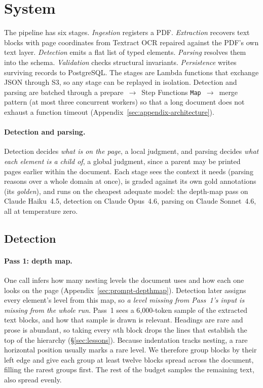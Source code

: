 \documentclass[11pt]{article}
\begin{document}
\section{System}
\label{sec:method}

The pipeline has six stages. \emph{Ingestion} registers a PDF.
\emph{Extraction} recovers text blocks with page coordinates from Textract OCR
repaired against the PDF's own text layer. \emph{Detection} emits a flat list of
typed elements. \emph{Parsing} resolves them into the schema.
\emph{Validation} checks structural invariants. \emph{Persistence} writes
surviving records to PostgreSQL. The stages are Lambda functions that exchange JSON
through S3, so any stage can be replayed in isolation. Detection and parsing
are batched through a prepare~$\rightarrow$~Step Functions
\texttt{Map}~$\rightarrow$~merge pattern (at most three concurrent workers) so
that a long document does not exhaust a function timeout
(Appendix~\ref{sec:appendix-architecture}).

\paragraph{Detection and parsing.} Detection decides \emph{what is on the page}, a local judgment, and parsing decides \emph{what each element is a child of}, a global judgment, since a parent may be printed pages earlier within the document. Each stage sees the context it needs (parsing reasons over a whole domain at once), is graded against its own gold annotations (its \emph{golden}), and runs on the cheapest adequate model: the depth-map pass on Claude Haiku~4.5, detection on Claude Opus~4.6, parsing on Claude Sonnet~4.6, all at temperature zero.

\subsection{Detection}
\label{sec:method-detection}

\paragraph{Pass 1: depth map.} One call infers how many nesting levels the document uses and how each one looks on the page (Appendix~\ref{sec:prompt-depthmap}). Detection later assigns every element's level from this map, so \emph{a level missing from Pass~1's input is missing from the whole run}. Pass~1 sees a 6{,}000-token sample of the extracted text blocks, and how that sample is drawn is relevant. Headings are rare and prose is abundant, so taking every $n$th block drops the lines that establish the top of the hierarchy (\S\ref{sec:lessons}). Because indentation tracks nesting, a rare horizontal position usually marks a rare level. We therefore group blocks by their left edge and give each group at least twelve blocks spread across the document, filling the rarest groups first. The rest of the budget samples the remaining text, also spread evenly.
\end{document}
